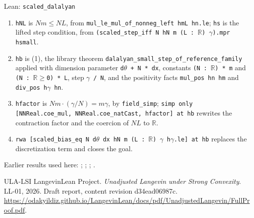 \documentclass[11pt,a4paper]{article}
\begin{document}
\begin{leanbox}{Lean: \texttt{scaled\_\allowbreak{}dalalyan}}
\begin{enumerate}


\item \texttt{h\allowbreak{}NL} is \(Nm\le NL\), from \texttt{mul\_\allowbreak{}le\_\allowbreak{}mul\_\allowbreak{}of\_\allowbreak{}nonneg\_\allowbreak{}left hm\allowbreak{}L hn.\allowbreak{}le}; \texttt{hs} is the lifted step condition, from \texttt{(scaled\_\allowbreak{}step\_\allowbreak{}iff N h\allowbreak{}N m (L : \ensuremath{\mathbb R}) \ensuremath{\gamma}).\allowbreak{}mpr hsmall}.

\item \texttt{hb} is (1), the library theorem \texttt{dalalyan\_\allowbreak{}small\_\allowbreak{}step\_\allowbreak{}of\_\allowbreak{}reference\_\allowbreak{}family} applied with dimension parameter \texttt{d\ensuremath{\theta} + N * dx}, constants \texttt{(N : \ensuremath{\mathbb R}) * m} and \texttt{(N : \ensuremath{\mathbb R}\ensuremath{\ge}0) * L}, step \texttt{\ensuremath{\gamma} /\allowbreak{} N}, and the positivity facts \texttt{mul\_\allowbreak{}pos hn hm} and \texttt{div\_\allowbreak{}pos h\ensuremath{\gamma} hn}.

\item \texttt{hfactor} is \(Nm\cdot(\gamma/N)=m\gamma\), by \texttt{field\_\allowbreak{}simp}; \texttt{simp only [NNReal.\allowbreak{}coe\_\allowbreak{}mul, NNReal.\allowbreak{}coe\_\allowbreak{}nat\allowbreak{}Cast, hfactor] at hb} rewrites the contraction factor and the coercion of \(NL\) to \(\mathbb R\).

\item \texttt{rwa [scaled\_\allowbreak{}bias\_\allowbreak{}eq N d\ensuremath{\theta} dx h\allowbreak{}N m (L : \ensuremath{\mathbb R}) \ensuremath{\gamma} h\ensuremath{\gamma}.\allowbreak{}le] at hb} replaces the discretization term and closes the goal.

\end{enumerate}
\end{leanbox}


Earlier results used here: \cite[Section~3.17.3]{LangevinLean2026ULASC}; \cite[Section~3.17.4]{LangevinLean2026ULASC}; \cite[Section~3.47.2]{LangevinLean2026ULASC}; \cite[Section~3.47.4]{LangevinLean2026ULASC}.

\begin{thebibliography}{ULA-LSI}
LangevinLean Project. \emph{Unadjusted Langevin under Strong Convexity}. LL-01, 2026. Draft report, content revision d34ead06987c. \url{https://odakyildiz.github.io/LangevinLean/docs/pdf/UnadjustedLangevin/FullProof.pdf}.
\end{thebibliography}
\end{document}
